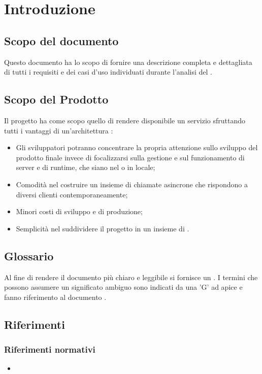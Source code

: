 \section{Introduzione}\label{Intro}
\subsection{Scopo del documento}
Questo documento ha lo scopo di fornire una descrizione completa e dettagliata di tutti i requisiti e dei casi d'uso individuati durante l'analisi del  \NomeProgetto{}.

\subsection{Scopo del Prodotto}
Il progetto {\NomeProgetto} ha come scopo quello di rendere disponibile un servizio  sfruttando tutti i vantaggi di un'architettura :
\begin{itemize}
  \item Gli sviluppatori potranno concentrare la propria attenzione sullo sviluppo del prodotto finale invece di focalizzarsi sulla gestione e sul funzionamento di server e di runtime, che siano nel  o in locale;
  \item Comodità nel costruire un insieme di chiamate asincrone che rispondono a diversi clienti contemporaneamente;
  \item Minori costi di sviluppo e di produzione;
  \item Semplicità nel suddividere il progetto in un insieme di .
\end{itemize}

\subsection{Glossario}
Al fine di rendere il documento più chiaro e leggibile si fornisce un {\Glossario}. I termini che possono assumere un significato ambiguo sono indicati da una 'G' ad apice e fanno riferimento al documento .

\subsection{Riferimenti}
\subsubsection{Riferimenti normativi}
\begin{itemize}
	\item {}
\end{itemize}
